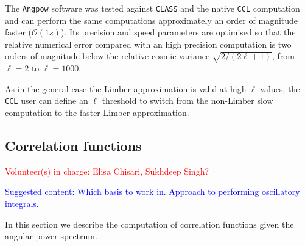 \documentclass[\docopts]{\docclass}
\newcommand{\vol}[1]{\textcolor{red}{Volunteer(s) in charge: #1}}
\newcommand{\cont}[1]{\textcolor{blue}{Suggested content: #1}}
\newcommand{\ccl}{{\tt CCL}\xspace}
\begin{document}
The \texttt{Angpow} software  was tested against \texttt{CLASS} and the native \ccl computation and can perform the same computations approximately an order of magnitude faster ($\mathcal{O}(1s)$). %
Its precision and speed parameters are optimised so that the relative numerical error compared with an high precision computation is two orders of magnitude below the relative cosmic variance $\sqrt{2/(2\ell+1)}$, from $\ell=2$ to $\ell=1000$. 

As in the general case the Limber approximation is valid at high $\ell$ values, the \ccl user can define an $\ell$ threshold to switch from the non-Limber slow computation to the faster Limber approximation.
 


\subsection{Correlation functions}
\vol{Elisa Chisari, Sukhdeep Singh?}

\cont{Which basis to work in. Approach to performing oscillatory integrals.}

In this section we describe the computation of correlation functions given the angular power
spectrum.
\end{document}
